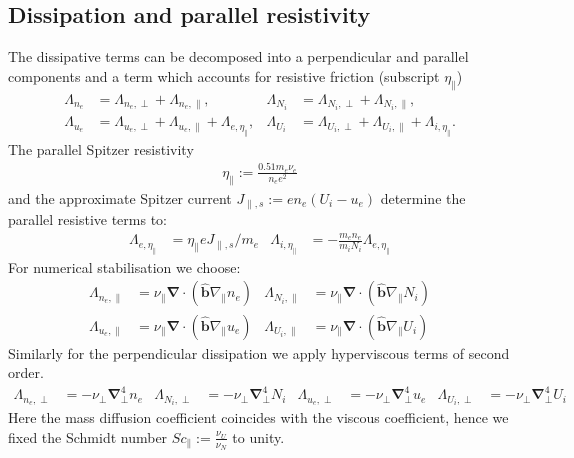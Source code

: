 \documentclass{hitec} %
\renewcommand{\vec}[1]{\boldsymbol{#1}}
\begin{document}
\subsection{Dissipation and parallel resistivity}\label{sec:dissres}
The dissipative terms can be decomposed into a perpendicular and parallel components and a term which accounts for resistive friction (subscript \(\eta_\parallel\)) 
\begin{align}
 \Lambda_{n_e} &= \Lambda_{n_e,\perp}+\Lambda_{n_e,\parallel}, &
 \Lambda_{N_i} &= \Lambda_{N_i,\perp}+\Lambda_{N_i,\parallel},\\
 \Lambda_{u_e} &= \Lambda_{u_e,\perp}+\Lambda_{u_e,\parallel}+\Lambda_{e,\eta_\parallel},&
 \Lambda_{U_i} &= \Lambda_{U_i,\perp}+\Lambda_{U_i,\parallel}+\Lambda_{i,\eta_\parallel}.
\end{align}
The parallel Spitzer resistivity
\begin{align}
\eta_\parallel := \frac{0.51 m_e \nu_e}{n_e e^2} 
\end{align}
and the approximate Spitzer current \(J_{\parallel,s}:= e n_e \left(U_i - u_e\right)\) determine the parallel resistive terms to:
\begin{align}
 \Lambda_{e,\eta_\parallel} &=  \eta_\parallel e J_{\parallel,s} /m_e  &
 \Lambda_{i,\eta_\parallel} &=- \frac{m_e n_e }{m_i N_i  }\Lambda_{e,\eta_\parallel}
\end{align}
For numerical stabilisation we choose:
\begin{align}
\Lambda_{n_e,\parallel} &=  \nu_\parallel\vec{\nabla} \cdot \left(\vec{\hat{b}} \nabla_\parallel n_e\right) &
 \Lambda_{N_i,\parallel} &=  \nu_\parallel\vec{\nabla} \cdot \left(\vec{\hat{b}} \nabla_\parallel N_i\right) \\
  \Lambda_{u_e,\parallel} &= \nu_\parallel \vec{\nabla} \cdot \left(\vec{\hat{b}} \nabla_\parallel u_e\right) &
 \Lambda_{U_i,\parallel} &= \nu_\parallel \vec{\nabla} \cdot \left(\vec{\hat{b}} \nabla_\parallel U_i\right) 
\end{align}
Similarly for the perpendicular dissipation we apply hyperviscous terms of second order.
\begin{align}\label{eq:perpdiffNT}
 \Lambda_{n_e,\perp} &=  -\nu_\perp \vec{\nabla}_\perp^4 n_e &
 \Lambda_{N_i,\perp} &=  -\nu_\perp \vec{\nabla}_\perp^4 N_i &
 \Lambda_{u_e,\perp} &=  -\nu_\perp \vec{\nabla}_\perp^4 u_e &
 \Lambda_{U_i,\perp} &=  -\nu_\perp \vec{\nabla}_\perp^4 U_i
\end{align}
Here the mass diffusion coefficient coincides with the viscous coefficient, hence we fixed the Schmidt number \(\mathit{Sc}_\parallel:= \frac{\nu_U}{\nu_N}\) to unity.
\end{document}
